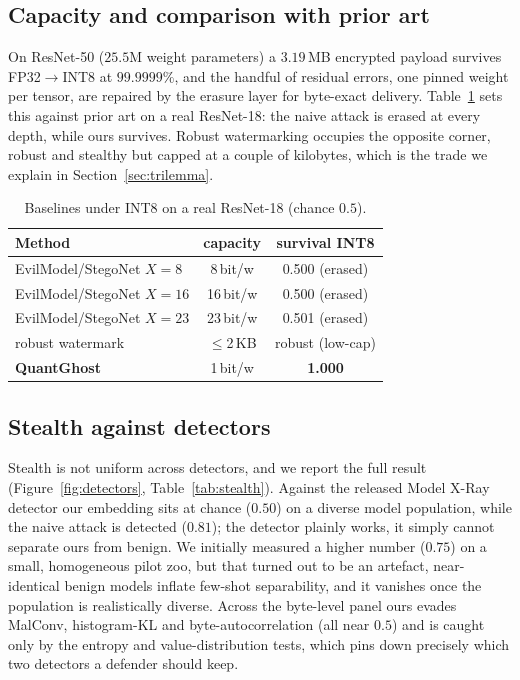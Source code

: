 \documentclass[a4paper,fleqn]{cas-dc}
\theoremstyle{plain}
\theoremstyle{remark}
\newcommand{\sys}{\mbox{QuantGhost}}
\begin{document}
\subsection{Capacity and comparison with prior art}
On ResNet-50 ($25.5$M weight parameters) a $3.19$\,MB encrypted payload survives
FP32$\to$INT8 at $99.9999\%$, and the handful of residual errors, one pinned weight
per tensor, are repaired by the erasure layer for byte-exact delivery.
Table~\ref{tab:baseline} sets this against prior art on a real ResNet-18: the naive
attack is erased at every depth, while ours survives. Robust watermarking
\citep{tondi2022robust,li2021stdm} occupies the opposite corner, robust and stealthy
but capped at a couple of kilobytes, which is the trade we explain in
Section~\ref{sec:trilemma}.

\begin{table}[t]\centering
\caption{Baselines under INT8 on a real ResNet-18 (chance $0.5$).}
\label{tab:baseline}
\begin{tabular*}{\columnwidth}{@{\extracolsep{\fill}}lcc@{}}
\toprule
Method & capacity & survival INT8\\
\midrule
EvilModel/StegoNet $X{=}8$ & 8\,bit/w & 0.500 (erased)\\
EvilModel/StegoNet $X{=}16$ & 16\,bit/w & 0.500 (erased)\\
EvilModel/StegoNet $X{=}23$ & 23\,bit/w & 0.501 (erased)\\
robust watermark & $\le$2\,KB & robust (low-cap)\\
\textbf{\sys} & 1\,bit/w & \textbf{1.000}\\
\bottomrule
\end{tabular*}
\end{table}

\subsection{Stealth against detectors}
Stealth is not uniform across detectors, and we report the full result (Figure~\ref{fig:detectors},
Table~\ref{tab:stealth}). Against the released Model X-Ray detector our embedding sits
at chance ($0.50$) on a diverse model population, while the naive attack is detected
($0.81$); the detector plainly works, it simply cannot separate ours from benign. We
initially measured a higher number ($0.75$) on a small, homogeneous pilot zoo, but that
turned out to be an artefact, near-identical benign models inflate few-shot
separability, and it vanishes once the population is realistically diverse. Across
the byte-level panel ours evades MalConv, histogram-KL and byte-autocorrelation
(all near $0.5$) and is caught only by the entropy and value-distribution tests, which
pins down precisely which two detectors a defender should keep.
\end{document}
